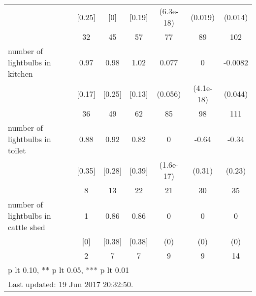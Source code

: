 \begin{table}[htbp]
\begin{tabular*}{1\hsize}{@{\hskip\tabcolsep\extracolsep\fill}l*{1}{cccccc}}
                                &   [0.25]&      [0]&   [0.19]&(6.3e-18)         &  (0.019)         &  (0.014)         \\
                                &       32&       45&       57&       77         &       89         &      102         \\
number of lightbulbs in kitchen &     0.97&     0.98&     1.02&    0.077         &        0         &  -0.0082         \\
                                &   [0.17]&   [0.25]&   [0.13]&  (0.056)         &(4.1e-18)         &  (0.044)         \\
                                &       36&       49&       62&       85         &       98         &      111         \\
number of lightbulbs in toilet  &     0.88&     0.92&     0.82&        0         &    -0.64\sym{*}  &    -0.34         \\
                                &   [0.35]&   [0.28]&   [0.39]&(1.6e-17)         &   (0.31)         &   (0.23)         \\
                                &        8&       13&       22&       21         &       30         &       35         \\
number of lightbulbs in cattle shed&        1&     0.86&     0.86&        0         &        0         &        0         \\
                                &      [0]&   [0.38]&   [0.38]&      (0)         &      (0)         &      (0)         \\
                                &        2&        7&        7&        9         &        9         &       14         \\
\bottomrule
\multicolumn{7}{l}{\footnotesize * p lt 0.10, ** p lt 0.05, *** p lt 0.01}\\
\multicolumn{7}{l}{\footnotesize Last updated: 19 Jun 2017 20:32:50.}\\
\end{tabular*}
\end{table}
